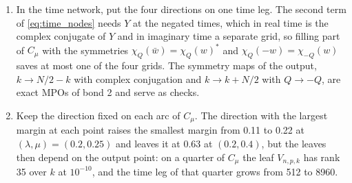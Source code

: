 \documentclass[aps,prb,reprint,a4paper]{revtex4-2}
\begin{document}
\begin{enumerate}
  \item In the time network, put the four directions on one time leg. The second term of \eqref{eq:time_nodes} needs $Y$ at the negated times, which in real time is the complex conjugate of $Y$ and in imaginary time a separate grid, so filling part of $C_\mu$ with the symmetries $\chi_Q(\bar w)=\chi_Q(w)^*$ and $\chi_Q(-w)=\chi_{-Q}(w)$ saves at most one of the four grids. The symmetry maps of the output, $k\to N/2-k$ with complex conjugation and $k\to k+N/2$ with $Q\to-Q$, are exact MPOs of bond 2 and serve as checks.
  \item Keep the direction fixed on each arc of $C_\mu$. The direction with the largest margin at each point raises the smallest margin from 0.11 to 0.22 at $(\lambda,\mu)=(0.2,0.25)$ and leaves it at 0.63 at $(0.2,0.4)$, but the leaves then depend on the output point: on a quarter of $C_\mu$ the leaf $V_{n,p,k}$ has rank 35 over $k$ at $10^{-10}$, and the time leg of that quarter grows from 512 to 8960.
\end{enumerate}
\end{document}
